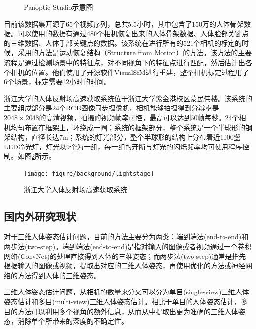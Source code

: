 \begin{figure}[ht] \centering
    \caption{\label{fig:panoptic} Panoptic Studio示意图\cite{Panoptic}}
\end{figure} 

目前该数据集开源了65个视频序列，总共5.5小时，其中包含了150万的人体骨架数据。可以使用的数据有通过480个相机恢复出来的人体骨架数据、人体脸部关键点的三维数据、人体手部关键点的数据。该系统在进行所有的521个相机的标定的时候，采用的方法是运动恢复结构（Structure from Motion）的方法。该方法的主要流程是通过检测场景中的特征点，对不同视角下的特征点进行匹配，然后估计出各个相机的位置。他们使用了开源软件VisualSfM进行重建，整个相机标定过程用了6个场景，标定需要12小时的时间。

浙江大学的人体反射场高速获取系统位于浙江大学紫金港校区蒙民伟楼。该系统的主要组成部分是24个RGB图像同步摄像机，相机能够拍摄得到分辨率是\(2048\times 2048\)的高清视频，拍摄的视频帧率可控，最高可以达到50帧每秒。24个相机均匀布置在框架上，环绕成一圈；系统的框架部分，整个系统是一个半球形的钢架结构，直径长达7m；系统的灯光部分，整个半球形的结构上分布着近1000盏LED冷光灯，灯光以9个为一组，每一组的开断与灯光的闪烁频率均可使用程序控制。如图\ref{fig:lightstage}所示。
\begin{figure}[htbp]
    \centering
    \texttt{[image: figure/background/lightstage]}
    \caption{\label{fig:lightstage} 浙江大学人体反射场高速获取系统}
\end{figure}

\subsection{国内外研究现状}

对于三维人体姿态估计问题，目前的方法主要分为两类：端到端法(end-to-end)\cite{pavlakos2017coarse}和两步法(two-step)\cite{zhou2016sparseness}。端到端法(end-to-end)\cite{pavlakos2017coarse}是指对输入的图像或者视频通过一个卷积网络(ConvNet)的处理直接得到人体的三维姿态；而两步法(two-step)\cite{zhou2016sparseness}通常是指先根据输入的图像或视频，提取出对应的二维人体姿态，再使用优化的方法或神经网络的方法得到人体的三维姿态。

三维人体姿态估计问题，从相机的数量来分又可以分为单目(single-view)三维人体姿态估计和多目(multi-view)三维人体姿态估计。相比于单目的人体姿态估计，多目的方法可以利用多个视角的额外信息，从而从中提取出更为准确的三维人体姿态，消除单个所带来的深度的不确定性。

